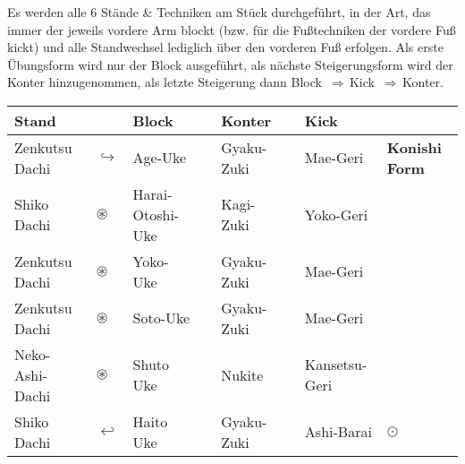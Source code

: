 \null\vfill\null
	\begin{center}
		\parbox{\textwidth-2\tabcolsep}{Es werden alle 6 Stände \& Techniken am Stück durchgeführt, in der Art, das immer der jeweils vordere Arm blockt (bzw. für die Fußtechniken der vordere Fuß kickt) und alle Standwechsel lediglich über den vorderen Fuß erfolgen. Als erste Übungsform wird nur der Block ausgeführt, als nächste Steigerungsform wird der Konter hinzugenommen, als letzte Steigerung dann \mbox{Block \(\Rightarrow\)\,Kick \(\Rightarrow\)\,Konter.}}
	\end{center}
	\begin{tabularx}{\textwidth}{lllXlXll}
		Stand	&&Block	&&Konter	&&Kick&\\
		\midrule
		Zenkutsu Dachi 	& \(\hookrightarrow\) & Age-Uke	&&Gyaku-Zuki	&&Mae-Geri&\textbf{Konishi Form}\\
		Shiko Dachi 	& \(\circledast\) & Harai-Otoshi-Uke	&&Kagi-Zuki&&Yoko-Geri&\\
		Zenkutsu Dachi	& \(\circledast\) & Yoko-Uke	&&Gyaku-Zuki&&Mae-Geri&\\
		Zenkutsu Dachi	& \(\circledast\) & Soto-Uke	&&Gyaku-Zuki&&Mae-Geri&\\
		Neko-Ashi-Dachi	& \(\circledast\) & Shuto Uke	&&Nukite&&Kansetsu-Geri&\\
		Shiko Dachi	& \(\hookleftarrow\) & Haito Uke	&&Gyaku-Zuki&&Ashi-Barai& \(\odot\)\\
		\midrule
	\end{tabularx}\\\null\vfill\null